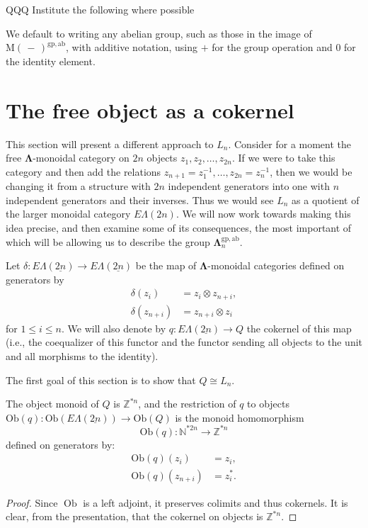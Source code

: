 \documentclass{amsbook} %
\newcommand{\ZZ}{\mathbb{Z}}
\newcommand{\ML}{\mathbf{\Lambda}}
\newcommand{\MLn}{\mathbf{\Lambda}_n}
\newcommand{\EL}{E\Lambda}
\newcommand{\ELnn}{E\Lambda(\underline{2n})}
\newcommand{\ob}{\operatorname{Ob}}
\newcommand{\ab}{\mathrm{ab}}
\newcommand{\gp}{\mathrm{gp}}
\numberwithin{section}{chapter}
\begin{document}
QQQ Institute the following where possible
\begin{conv}\label{plus}
We default to writing any abelian group, such as those in the image of $\mathrm{M}(\, - \,)^{\gp,\ab}$, with additive notation, using $+$ for the group operation and 0 for the identity element.
\end{conv}



\section{The free object as a cokernel}
\label{colimalgebra} 
This section will present a different approach to $L_n$. Consider for a moment the free $\ML$-monoidal category on $2n$ objects $z_1, z_2, \ldots, z_{2n}$. If we were to take this category and then add the relations $z_{n+1} = z_1^{-1}, \ldots, z_{2n} = z_n^{-1}$, then we would be changing it from a structure with $2n$ independent generators into one with $n$ independent generators and their inverses. Thus we would see $L_n$ as a quotient of the larger monoidal category $\EL(2n)$. We will now work towards making this idea precise, and then examine some of its consequences, the most important of which will be allowing us to describe the group $\MLn^{\gp,\ab}$.


\begin{Defi}\label{qdef} Let $\delta \colon \EL(\underline{2n})\rightarrow \EL(\underline{2n})$ be the map of $\ML$-monoidal categories defined on generators by
  \begin{align*}
  		\delta(z_{i}) &= z_i \otimes z_{n+i}, \\
  		\delta(z_{n+i}) &= z_{n+i} \otimes z_i
  \end{align*}
for $1 \le i \le n$. We will also denote by $q \colon  \EL(\underline{2n}) \rightarrow Q$ the cokernel of this map (i.e., the coequalizer of this functor and the functor sending all objects to the unit and all morphisms to the identity).  
\end{Defi}


The first goal of this section is to show that $Q \cong L_n$.

\begin{prop}\label{Qobj} The object monoid of $Q$ is $\mathbb{Z}^{*n}$, and the restriction of $q$ to objects $\mathrm{Ob}(q) \colon  \mathrm{Ob}(\ELnn) \rightarrow \mathrm{Ob}(Q)$ is the monoid homomorphism
  \[
    \mathrm{Ob}(q) \colon \mathbb{N}^{\ast 2n} \rightarrow \mathbb{Z}^{\ast n}
  \]
defined on generators by:
  \begin{align*}
  			\mathrm{Ob}(q)(z_i) &= z_i,\\
  			\mathrm{Ob}(q)(z_{n+i}) &= z_i^*.		
  \end{align*}
\end{prop}
\begin{proof}
Since $\ob$ is a left adjoint, it preserves colimits and thus cokernels. It is clear, from the presentation, that the cokernel on objects is $\ZZ^{*n}$.
\end{proof}
\end{document}
